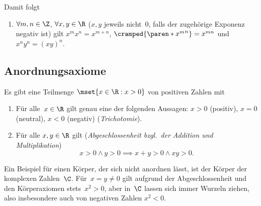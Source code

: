 \documentclass[a4paper]{article}
\begin{document}
Damit folgt
\begin{enumerate}[resume*=conclusions]
    \item $\forall m, n \in \Z$, $\forall x, y \in \R$ ($x, y$ jeweils nicht~$0$, falls der zugehörige Exponenz negativ ist) gilt $x^m x^n = x^{m+n}$, $\cramped{\paren*{x^m}^n} = x^{mn}$ und $x^n y^n = (xy)^n$.
\end{enumerate}

\subsection{Anordnungsaxiome}

\begin{axiom}[Anordnungsaxiome]
    Es gibt eine Teilmenge $\mset{x \in \R : x > 0}$ von positiven Zahlen mit
    \begin{enumerate}[resume*=axioms]
        \item Für alle~$x \in \R$ gilt genau eine der folgenden Aussagen: $x > 0$ (positiv), $x = 0$ (neutral), $x < 0$ (negativ) (\emph{Trichotomie}).
        \item Für alle $x, y \in \R$ gilt (\emph{Abgeschlossenheit bzgl.\ der Addition und Multiplikation})
              \begin{equation*}
                  x > 0 \wedge y > 0 \implies x + y > 0 \wedge x y > 0.
              \end{equation*}\label{ax:oc}
    \end{enumerate}
\end{axiom}

Ein Beispiel für einen Körper, der sich nicht anordnen lässt, ist der Körper der komplexen Zahlen~$\C$. Für~$x = y \neq 0$ gilt aufgrund der Abgeschlossenheit und den Körperaxiomen stets~$x^2 > 0$, aber in~$\C$ lassen sich immer Wurzeln ziehen, also insbesondere auch von negativen Zahlen $x^2 < 0$.
\end{document}
